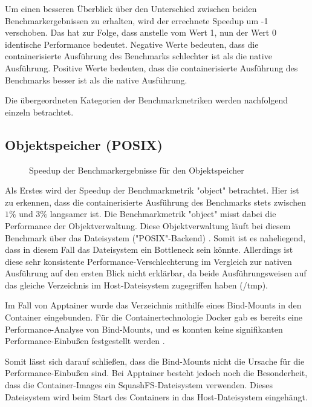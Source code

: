 Um einen besseren Überblick über den Unterschied zwischen beiden Benchmarkergebnissen zu erhalten, wird der errechnete Speedup um -1 verschoben. Das hat zur Folge, dass anstelle vom Wert 1, nun der Wert 0 identische Performance bedeutet. 
Negative Werte bedeuten, dass die containerisierte Ausführung des Benchmarks schlechter ist als die native Ausführung. Positive Werte bedeuten, dass die containerisierte Ausführung des Benchmarks besser ist als die native Ausführung. 

Die übergeordneten Kategorien der Benchmarkmetriken werden nachfolgend einzeln betrachtet.

\subsection{Objektspeicher (POSIX)} \label{sec:object-speedup}

\begin{figure}[H]
    \centering
    
    \caption{Speedup der Benchmarkergebnisse für den Objektspeicher}
    \label{fig:speedup_object}
\end{figure}

\FloatBarrier

Als Erstes wird der Speedup der Benchmarkmetrik "object" betrachtet. Hier ist zu erkennen, dass die containerisierte Ausführung des Benchmarks stets zwischen $1\%$ und $3\%$ langsamer ist. Die Benchmarkmetrik "object" misst dabei die Performance der Objektverwaltung. Diese Objektverwaltung läuft bei diesem Benchmark über das Dateisystem ("POSIX"-Backend) \cite[Vgl. S. 719]{kuhnJULEAFlexibleStorage2017}. Somit ist es naheliegend, dass in diesem Fall das Dateisystem ein Bottleneck sein könnte. Allerdings ist diese sehr konsistente Performance-Verschlechterung im Vergleich zur nativen Ausführung auf den ersten Blick nicht erklärbar, da beide Ausführungsweisen auf das gleiche Verzeichnis im Host-Dateisystem zugegriffen haben (/tmp). 

Im Fall von Apptainer wurde das Verzeichnis mithilfe eines Bind-Mounts in den Container eingebunden. Für die Containertechnologie Docker gab es bereits eine Performance-Analyse von Bind-Mounts, und es konnten keine signifikanten Performance-Einbußen festgestellt werden \cite[Vgl. S. 4f]{dordevicFileSystemPerformance2022}. 

Somit lässt sich darauf schließen, dass die Bind-Mounts nicht die Ursache für die Performance-Einbußen sind. Bei Apptainer besteht jedoch noch die Besonderheit, dass die Container-Images ein SquashFS-Dateisystem verwenden. Dieses Dateisystem wird beim Start des Containers in das Host-Dateisystem eingehängt. 

